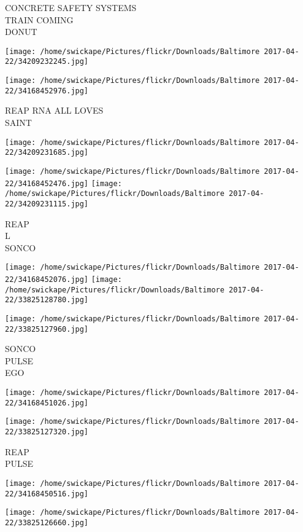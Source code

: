\documentclass[10pt,letterpaper]{article}
\begin{document}
CONCRETE SAFETY SYSTEMS\\
TRAIN COMING\\
DONUT
\pagebreak

\texttt{[image: /home/swickape/Pictures/flickr/Downloads/Baltimore 2017-04-22/34209232245.jpg]}

\vspace{0.25in}
\texttt{[image: /home/swickape/Pictures/flickr/Downloads/Baltimore 2017-04-22/34168452976.jpg]}

REAP RNA ALL LOVES\\
SAINT
\pagebreak

\texttt{[image: /home/swickape/Pictures/flickr/Downloads/Baltimore 2017-04-22/34209231685.jpg]}

\vspace{0.25in}
\texttt{[image: /home/swickape/Pictures/flickr/Downloads/Baltimore 2017-04-22/34168452476.jpg]}
\texttt{[image: /home/swickape/Pictures/flickr/Downloads/Baltimore 2017-04-22/34209231115.jpg]}

REAP\\
L\\
SONCO
\pagebreak

\texttt{[image: /home/swickape/Pictures/flickr/Downloads/Baltimore 2017-04-22/34168452076.jpg]}
\texttt{[image: /home/swickape/Pictures/flickr/Downloads/Baltimore 2017-04-22/33825128780.jpg]}

\vspace{0.25in}
\texttt{[image: /home/swickape/Pictures/flickr/Downloads/Baltimore 2017-04-22/33825127960.jpg]}

SONCO\\
PULSE\\
EGO
\pagebreak

\texttt{[image: /home/swickape/Pictures/flickr/Downloads/Baltimore 2017-04-22/34168451026.jpg]}

\vspace{0.25in}
\texttt{[image: /home/swickape/Pictures/flickr/Downloads/Baltimore 2017-04-22/33825127320.jpg]}

REAP\\
PULSE
\pagebreak

\texttt{[image: /home/swickape/Pictures/flickr/Downloads/Baltimore 2017-04-22/34168450516.jpg]}

\vspace{0.25in}
\texttt{[image: /home/swickape/Pictures/flickr/Downloads/Baltimore 2017-04-22/33825126660.jpg]}
\end{document}
